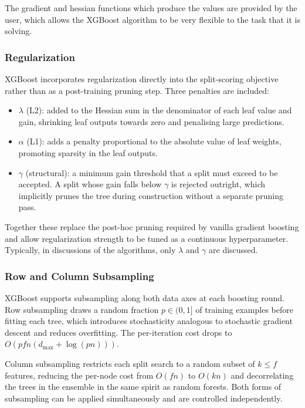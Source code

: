 \documentclass[a4paper, 11pt]{article}
\begin{document}
The gradient and hessian functions which produce the values are
provided by the user, which allows the XGBoost algorithm to be very
flexible to the task that it is solving.

\subsubsection{Regularization}

XGBoost incorporates regularization directly into the split-scoring
objective rather than as a post-training pruning step. Three
penalties are included:
\begin{itemize}
  \item $\lambda$ (L2): added to the Hessian sum in the denominator
    of each leaf value and gain, shrinking leaf outputs towards zero
    and penalising large predictions.
  \item $\alpha$ (L1): adds a penalty proportional to the absolute
    value of leaf weights, promoting sparsity in the leaf outputs.
  \item $\gamma$ (structural): a minimum gain threshold that a split
    must exceed to be accepted. A split whose gain falls below
    $\gamma$ is rejected outright, which implicitly prunes the tree
    during construction without a separate pruning pass.
\end{itemize}
Together these replace the post-hoc pruning required by vanilla
gradient boosting and allow regularization strength to be tuned as
a continuous hyperparameter. Typically, in discussions of the
algorithms, only $\lambda$ and $\gamma$ are discussed.

\subsubsection{Row and Column Subsampling}

XGBoost supports subsampling along both data axes at each boosting
round. Row subsampling draws a random fraction $p \in (0,1]$ of
training examples before fitting each tree, which introduces
stochasticity analogous to stochastic gradient descent and reduces
overfitting. The per-iteration cost drops to
$O\!\left(pfn(d_{\max} + \log(pn))\right)$.

Column subsampling restricts each split search to a random subset of
$k \leq f$ features, reducing the per-node cost from $O(fn)$ to
$O(kn)$ and decorrelating the trees in the ensemble in the same
spirit as random forests. Both forms of subsampling can be applied
simultaneously and are controlled independently.
\end{document}
